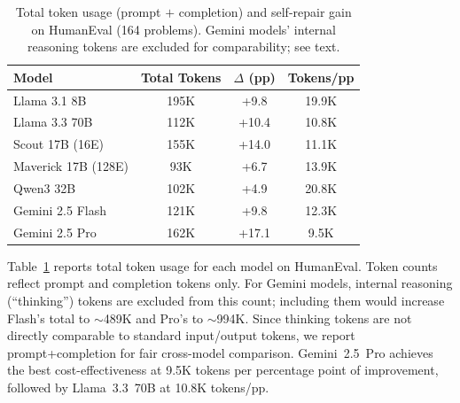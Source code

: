 \documentclass[conference]{IEEEtran}
\begin{document}
\begin{table}[t]
\centering
\caption{Total token usage (prompt $+$ completion) and self-repair gain on HumanEval (164 problems). Gemini models' internal reasoning tokens are excluded for comparability; see text.}
\label{tab:tokens}
\begin{tabular}{lccc}
\toprule
\textbf{Model} & \textbf{Total Tokens} & $\Delta$ \textbf{(pp)} & \textbf{Tokens/pp} \\
\midrule
Llama 3.1 8B     & 195K & +9.8  & 19.9K \\
Llama 3.3 70B    & 112K & +10.4 & 10.8K \\
Scout 17B (16E)  & 155K & +14.0 & 11.1K \\
Maverick 17B (128E) & 93K  & +6.7  & 13.9K \\
Qwen3 32B        & 102K & +4.9  & 20.8K \\
\midrule
Gemini 2.5 Flash & 121K & +9.8  & 12.3K \\
Gemini 2.5 Pro   & 162K & +17.1 & 9.5K \\
\bottomrule
\end{tabular}
\end{table}

Table~\ref{tab:tokens} reports total token usage for each model on HumanEval. Token counts reflect prompt and completion tokens only. For Gemini models, internal reasoning (``thinking'') tokens are excluded from this count; including them would increase Flash's total to $\sim$489K and Pro's to $\sim$994K. Since thinking tokens are not directly comparable to standard input/output tokens, we report prompt+completion for fair cross-model comparison. Gemini~2.5~Pro achieves the best cost-effectiveness at 9.5K tokens per percentage point of improvement, followed by Llama~3.3~70B at 10.8K tokens/pp.

\begin{table}[t]
\centering
\caption{Per-round repair breakdown on HumanEval: number of problems first solved at each round, and the repair success rate (fraction of initially-failed problems eventually repaired).}
\label{tab:perround}
\end{table}
\end{document}
